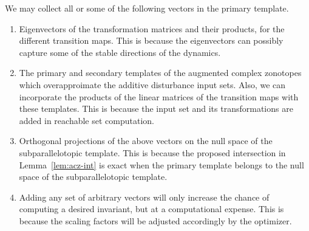   We may collect all or some of
the following vectors in the primary template.
%
\begin{enumerate}
\item Eigenvectors of the transformation matrices and their products, for the
   different transition maps.  This is because the eigenvectors can
  possibly capture some of the stable directions of the dynamics.
\item The primary and secondary templates of the augmented complex
  zonotopes which overapproimate the additive disturbance input sets.
  Also, we can incorporate the products of the linear matrices of the
  transition maps with these templates.  This is because the input set and
  its transformations are added in reachable set
  computation.
\item Orthogonal projections of the above vectors on the null
  space of the subparallelotopic template.  This is because the
  proposed intersection in Lemma~\ref{lem:acz-int} is exact when the
  primary template belongs to the null space of the subparallelotopic
  template.
\item Adding any set of arbitrary vectors will only increase the chance of computing a desired
  invariant, but at a computational expense.  This is because the
  scaling factors will be adjusted accordingly by the optimizer. 
\end{enumerate}

